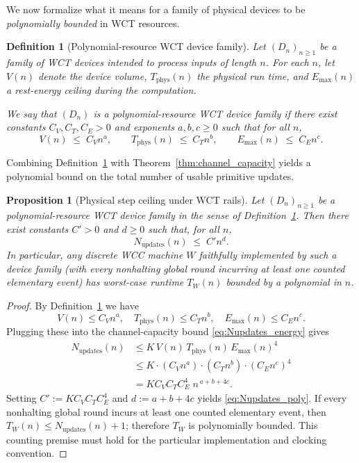 \documentclass[12pt]{article}
\newtheorem{definition}[theorem]{Definition}
\newtheorem{proposition}[theorem]{Proposition}
\begin{document}
We now formalize what it means for a family of physical devices to be
\emph{polynomially bounded} in WCT resources.

\begin{definition}[Polynomial-resource WCT device family]
\label{def:poly_resource_wct}
Let $(D_n)_{n\ge 1}$ be a family of WCT devices intended to process inputs
of length $n$. For each $n$, let $V(n)$ denote the device volume,
$T_{\mathrm{phys}}(n)$ the physical run time, and $E_{\max}(n)$ a rest-energy
ceiling during the computation.

We say that $(D_n)$ is a \emph{polynomial-resource WCT device family} if
there exist constants $C_V,C_T,C_E > 0$ and exponents $a,b,c \ge 0$ such that
for all $n$,
\begin{equation}
  \label{eq:poly_resource_scaling}
  V(n) \;\le\; C_V n^{a},\qquad
  T_{\mathrm{phys}}(n) \;\le\; C_T n^{b},\qquad
  E_{\max}(n) \;\le\; C_E n^{c}.
\end{equation}
\end{definition}

Combining Definition~\ref{def:poly_resource_wct} with
Theorem~\ref{thm:channel_capacity} yields a polynomial bound on the total
number of usable primitive updates.

\begin{proposition}[Physical step ceiling under WCT rails]
\label{prop:phys_step_ceiling}
Let $(D_n)_{n\ge 1}$ be a polynomial-resource WCT device family in the sense
of Definition~\ref{def:poly_resource_wct}. Then there exist constants
$C' > 0$ and $d \ge 0$ such that, for all $n$,
\begin{equation}
  \label{eq:Nupdates_poly}
  N_{\mathrm{updates}}(n) \;\le\; C' n^{d}.
\end{equation}
In particular, any discrete WCC machine $W$ faithfully implemented by such
a device family (with every nonhalting global round incurring at least one
counted elementary event) has worst-case runtime
$T_W(n)$ bounded by a polynomial in $n$.
\end{proposition}

\begin{proof}
By Definition~\ref{def:poly_resource_wct} we have
\[
V(n) \le C_V n^{a},\quad
T_{\mathrm{phys}}(n) \le C_T n^{b},\quad
E_{\max}(n) \le C_E n^{c}.
\]
Plugging these into the channel-capacity bound
\eqref{eq:Nupdates_energy} gives
\[
\begin{aligned}
N_{\mathrm{updates}}(n)
&\le K\,V(n)\,T_{\mathrm{phys}}(n)\,E_{\max}(n)^4\\
&\le K \cdot (C_V n^{a}) \cdot (C_T n^{b}) \cdot (C_E n^{c})^4\\
&= K C_V C_T C_E^4 \; n^{\,a + b + 4c}.
\end{aligned}
\]
Setting $C' := K C_V C_T C_E^4$ and $d := a + b + 4c$ yields
\eqref{eq:Nupdates_poly}. If every nonhalting global round incurs at least one counted
elementary event, then $T_W(n)\le N_{\mathrm{updates}}(n)+1$;
therefore $T_W$ is polynomially bounded. This counting premise must
hold for the particular implementation and clocking convention.
\end{proof}
\end{document}

